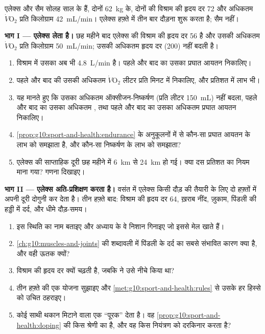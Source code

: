 \begin{problem}
\label{pb:g10:sport-and-health:1}
एलेक्स और सैम सोलह साल के हैं, दोनों \qty{62}{kg} के, दोनों की विश्राम की
हृदय दर 72 और अधिकतम $\dot V\!\mathrm{O_2}$ प्रति किलोग्राम
\qty{42}{mL/min}। एलेक्स हफ़्ते में तीन बार दौड़ना शुरू करता है; सैम नहीं।

\medskip
\noindent\textbf{भाग I --- एलेक्स  लेता है।}
छह महीने बाद एलेक्स की विश्राम की हृदय दर 56 है और उसकी अधिकतम
$\dot V\!\mathrm{O_2}$ प्रति किलोग्राम \qty{50}{mL/min}; उसकी अधिकतम
हृदय दर (200) नहीं बदली है।
\begin{enumerate}
  \item विश्राम में उसका  अब भी \qty{4.8}{L/min} है। पहले और
        बाद का उसका प्रघात आयतन निकालिए।
  \item पहले और बाद की उसकी अधिकतम $\dot V\!\mathrm{O_2}$ लीटर प्रति
        मिनट में निकालिए, और प्रतिशत में लाभ भी।
  \item यह मानते हुए कि उसका अधिकतम ऑक्सीजन-निष्कर्षण (प्रति लीटर
        \qty{150}{mL}) नहीं बदला, पहले और बाद का उसका अधिकतम
        , तथा पहले और बाद का उसका अधिकतम प्रघात आयतन
        निकालिए।
  \item \cref{prop:g10:sport-and-health:endurance} के अनुकूलनों में से
        कौन-सा प्रघात आयतन के लाभ को समझाता है, और कौन-सा निष्कर्षण के
        लाभ को समझाता?
  \item एलेक्स की साप्ताहिक दूरी छह महीने में \qty{6}{km} से
        \qty{24}{km} हो गई। क्या दस प्रतिशत का नियम माना गया? गणना
        दिखाइए।
\end{enumerate}

\medskip
\noindent\textbf{भाग II --- एलेक्स अति-प्रशिक्षण करता है।}
वसंत में एलेक्स किसी दौड़ की तैयारी के लिए दो हफ़्तों में अपनी दूरी दोगुनी
कर देता है। तीन हफ़्ते बाद: विश्राम की हृदय दर 64, ख़राब नींद, ज़ुकाम,
पिंडली की हड्डी में दर्द, और धीमे दौड़-समय।
\begin{enumerate}[resume]
  \item इस स्थिति का नाम बताइए और अध्याय के वे निशान गिनाइए जो इससे मेल
        खाते हैं।
  \item \cref{ch:g10:muscles-and-joints} की शब्दावली में पिंडली के दर्द
        का सबसे संभावित कारण क्या है, और वही ऊतक क्यों?
  \item विश्राम की हृदय दर क्यों चढ़ती है, जबकि  ने उसे नीचे
        किया था?
  \item तीन हफ़्ते की एक योजना सुझाइए और \cref{met:g10:sport-and-health:rules}
        से उसके हर हिस्से को उचित ठहराइए।
  \item कोई साथी थकान मिटाने वाला एक ``पूरक'' देता है। वह
        \cref{prop:g10:sport-and-health:doping} की किस श्रेणी का है, और
        वह किस नियंत्रण को दरकिनार करता है?
\end{enumerate}


\end{problem}
